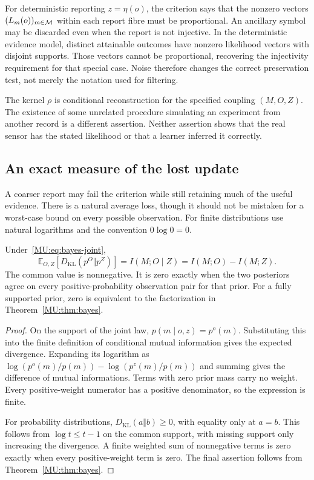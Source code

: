 For deterministic reporting $z=\eta(o)$, the criterion says that the nonzero vectors $(L_m(o))_{m\in\mathcal M}$ within each report fibre must be proportional. An ancillary symbol may be discarded even when the report is not injective. In the deterministic evidence model, distinct attainable outcomes have nonzero likelihood vectors with disjoint supports. Those vectors cannot be proportional, recovering the injectivity requirement for that special case. Noise therefore changes the correct preservation test, not merely the notation used for filtering.

The kernel $\rho$ is conditional reconstruction for the specified coupling $(M,O,Z)$. The existence of some unrelated procedure simulating an experiment from another record is a different assertion. Neither assertion shows that the real sensor has the stated likelihood or that a learner inferred it correctly.

\subsection{An exact measure of the lost update}
A coarser report may fail the criterion while still retaining much of the useful evidence. There is a natural average loss, though it should not be mistaken for a worst-case bound on every possible observation. For finite distributions use natural logarithms and the convention $0\log 0=0$.

\begin{MUproposition}\label{MU:prop:posterior-information}
Under~\eqref{MU:eq:bayes-joint},
\begin{equation}\label{MU:eq:posterior-kl}
\mathbb E_{O,Z}\!\left[D_{\mathrm{KL}}(p^O\Vert p^Z)\right]
=I(M;O\mid Z)=I(M;O)-I(M;Z).
\end{equation}
The common value is nonnegative. It is zero exactly when the two posteriors agree on every positive-probability observation pair for that prior. For a fully supported prior, zero is equivalent to the factorization in Theorem~\ref{MU:thm:bayes}.
\end{MUproposition}
\begin{proof}
On the support of the joint law, $p(m\mid o,z)=p^o(m)$. Substituting this into the finite definition of conditional mutual information gives the expected divergence. Expanding its logarithm as $\log(p^o(m)/p(m))-\log(p^z(m)/p(m))$ and summing gives the difference of mutual informations. Terms with zero prior mass carry no weight. Every positive-weight numerator has a positive denominator, so the expression is finite.

For probability distributions, $D_{\mathrm{KL}}(a\Vert b)\geq0$, with equality only at $a=b$. This follows from $\log t\leq t-1$ on the common support, with missing support only increasing the divergence. A finite weighted sum of nonnegative terms is zero exactly when every positive-weight term is zero. The final assertion follows from Theorem~\ref{MU:thm:bayes}.
\end{proof}

